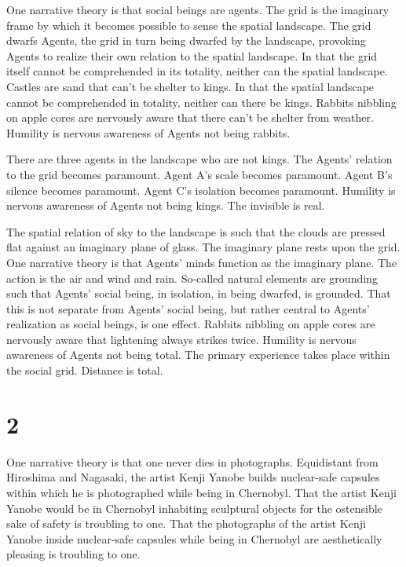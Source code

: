\documentclass[
]{memoir}
\begin{document}
One narrative theory is that social beings are agents. The grid is the
imaginary frame by which it becomes possible to sense the spatial
landscape. The grid dwarfs Agents, the grid in turn being dwarfed by the
landscape, provoking Agents to realize their own relation to the spatial
landscape. In that the grid itself cannot be comprehended in its
totality, neither can the spatial landscape. Castles are sand that can't
be shelter to kings. In that the spatial landscape cannot be
comprehended in totality, neither can there be kings. Rabbits nibbling
on apple cores are nervously aware that there can't be shelter from
weather. Humility is nervous awareness of Agents not being rabbits.

There are three agents in the landscape who are not kings. The Agents'
relation to the grid becomes paramount. Agent A's scale becomes
paramount. Agent B's silence becomes paramount. Agent C's isolation
becomes paramount. Humility is nervous awareness of Agents not being
kings. The invisible is real.

The spatial relation of sky to the landscape is such that the clouds are
pressed flat against an imaginary plane of glass. The imaginary plane
rests upon the grid. One narrative theory is that Agents' minds function
as the imaginary plane. The action is the air and wind and rain.
So-called natural elements are grounding such that Agents' social being,
in isolation, in being dwarfed, is grounded. That this is not separate
from Agents' social being, but rather central to Agents' realization as
social beings, is one effect. Rabbits nibbling on apple cores are
nervously aware that lightening always strikes twice. Humility is
nervous awareness of Agents not being total. The primary experience
takes place within the social grid. Distance is total.

\hypertarget{section-3}{%
\section*{2}\label{section-3}}

One narrative theory is that one never dies in photographs. Equidistant
from Hiroshima and Nagasaki, the artist Kenji Yanobe builds nuclear-safe
capsules within which he is photographed while being in Chernobyl. That
the artist Kenji Yanobe would be in Chernobyl inhabiting sculptural
objects for the ostensible sake of safety is troubling to one. That the
photographs of the artist Kenji Yanobe inside nuclear-safe capsules
while being in Chernobyl are aesthetically pleasing is troubling to one.
\end{document}
